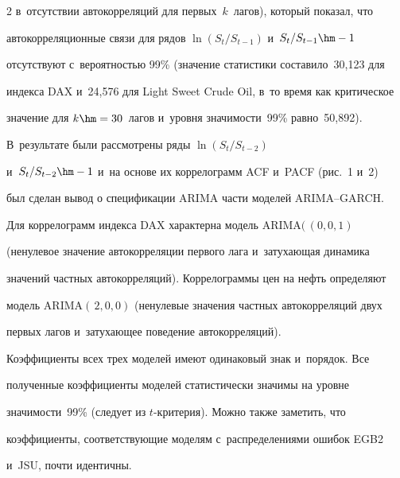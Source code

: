 \begin{multicols}{2}
в~отсутствии автокорреляций для первых~$k$~лагов), который показал, что 


автокорреляционные связи для рядов $\ln (S_t/S_{t-1})$ и~$S_t/S_{t-1}\hm-1$ 


отсутствуют с~вероятностью 99\% (значение статистики составило~30,123 для 


индекса DAX и~24,576 для Light Sweet Crude Oil, в~то время как критическое 


значение для $k\hm=30$~лагов и~уровня значимости~99\% равно~50,892). 


В~результате были рассмотрены ряды $\ln(S_t/S_{t-2})$  


и~$S_t/S_{t-2}\hm- 1$ и~на основе их коррелограмм ACF и~PACF (рис.~1 и~2) 


был сделан вывод о спецификации ARIMA части моделей ARIMA--GARCH.


{





}





  Для коррелограмм индекса DAX характерна модель ARIMA$(\,(0,0,1)$ 


(ненулевое значение автокорреляции первого лага и~затухающая динамика 


значений частных автокорреляций). Коррелограммы цен на нефть определяют 


модель ARIMA$(\,2,0,0)$  (ненулевые значения частных автокорреляций двух 


первых лагов и~затухающее поведение автокорреляций). 


{





}


  


  Коэффициенты всех трех моделей имеют одинаковый знак и~порядок. Все 


полученные коэффициенты моделей статистически значимы на уровне 


значимости~99\% (следует из $t$-кри\-те\-рия). Можно также заметить, что 


коэффициенты, соответствующие моделям с~распределениями ошибок EGB2 


и~JSU, почти идентичны.





  



\end{multicols}
